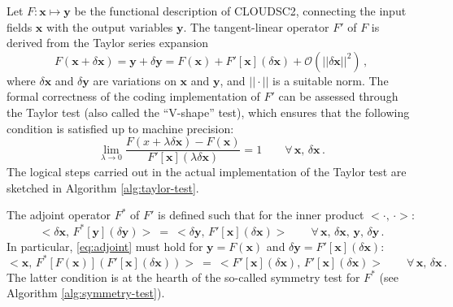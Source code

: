 \documentclass[gmd,manuscript,online]{copernicus}
\theoremstyle{theorem}
\theoremstyle{definition}
\theoremstyle{remark}
\theoremstyle{proposition}
\begin{document}
	Let $F: \boldsymbol{x} \mapsto \boldsymbol{y}$ be the functional description of CLOUDSC2, connecting the input fields $\boldsymbol{x}$ with the output variables $\boldsymbol{y}$. The tangent-linear operator $F'$ of $F$ is derived from the Taylor series expansion
	\begin{equation}
		F \left( \boldsymbol{x} + \delta \boldsymbol{x} \right) = \boldsymbol{y} + \delta \boldsymbol{y} = F \left( \boldsymbol{x} \right) + F' \left[ \boldsymbol{x} \right] \left( \delta \boldsymbol{x} \right) + \mathcal{O} \left( ||\delta \boldsymbol{x} ||^2 \right) \, ,
	\end{equation}
	where $\delta \boldsymbol{x}$ and $\delta \boldsymbol{y}$ are variations on $\boldsymbol{x}$ and $\boldsymbol{y}$, and $|| \cdot ||$ is a suitable norm. The formal correctness of the coding implementation of $F'$ can be assessed through the Taylor test (also called the ``V-shape'' test), which ensures that the following condition is satisfied up to machine precision:
	\begin{equation}
		\lim_{\lambda \to 0} \dfrac{F \left( x + \lambda \delta \boldsymbol{x} \right) - F \left( \boldsymbol{x} \right)}{F' \left[ \boldsymbol{x} \right] \left( \lambda \delta \boldsymbol{x} \right)} = 1 \qquad \forall \, \boldsymbol{x}, \, \delta \boldsymbol{x} \, .
	\end{equation}
	The logical steps carried out in the actual implementation of the Taylor test are sketched in Algorithm \ref{alg:taylor-test}.

	The adjoint operator $F^*$ of $F'$ is defined such that for the inner product $< \cdot, \, \cdot >$:
	\begin{equation}
		\label{eq:adjoint}
		< \delta \boldsymbol{x}, \, F^* \left[ \boldsymbol{y} \right] \left( \delta \boldsymbol{y} \right) > ~ = ~ < \delta \boldsymbol{y}, \, F' \left[ \boldsymbol{x} \right] \left( \delta \boldsymbol{x} \right) > \qquad \forall \, \boldsymbol{x}, \, \delta \boldsymbol{x}, \, \boldsymbol{y}, \, \delta \boldsymbol{y} \, .
	\end{equation}
	In particular, \eqref{eq:adjoint} must hold for $\boldsymbol{y} = F \left( \boldsymbol{x} \right)$ and $\delta \boldsymbol{y} = F' \left[ \boldsymbol{x} \right] \left( \delta \boldsymbol{x} \right)$:
	\begin{equation}
		\label{eq:symmetry-test}
		< \boldsymbol{x}, \, F^* \left[ F \left( \boldsymbol{x} \right) \right] \left( F' \left[ \boldsymbol{x} \right] \left( \delta \boldsymbol{x} \right) \right) > ~ = ~ < F' \left[ \boldsymbol{x} \right] \left( \delta \boldsymbol{x} \right), \, F' \left[ \boldsymbol{x} \right] \left( \delta \boldsymbol{x} \right) > \qquad \forall \, \boldsymbol{x}, \, \delta \boldsymbol{x} \, .
	\end{equation}
	The latter condition is at the hearth of the so-called symmetry test for $F^*$ (see Algorithm \ref{alg:symmetry-test}).
\end{document}
